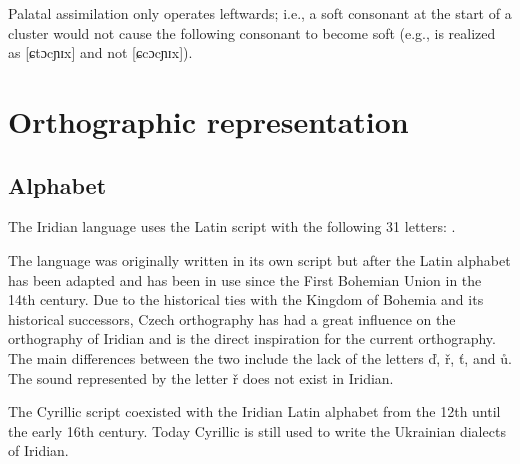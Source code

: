 Palatal assimilation only operates leftwards; i.e., a soft consonant at the
start of a cluster would not cause the following consonant to become soft (e.g.,
 is realized as [ɕtɔcɲɪx] and not [ɕcɔcɲɪx]). 


\section{Orthographic representation}\label{sec:ortho}
\subsection{Alphabet}

The Iridian language uses the Latin script with the following 31 letters:
.

The language was originally written in its own script but after the Latin
alphabet has been adapted and has been in use since the First Bohemian Union in
the 14th century. Due to the historical ties with the Kingdom of Bohemia and its
historical successors, Czech orthography has had a great influence on the
orthography of Iridian and is the direct inspiration for the current
orthography. The main differences between the two include the lack of the
letters ď, ř, ť, and ů. The sound represented by the letter
ř does not exist in Iridian.

The Cyrillic script coexisted with the Iridian Latin alphabet from the 12th
until the early 16th century. Today Cyrillic is still used to write the
Ukrainian dialects of Iridian.

